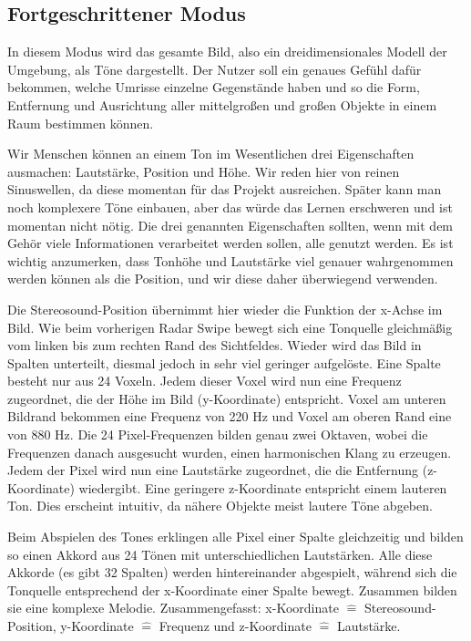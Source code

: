 \documentclass[a4paper,12pt,ngerman]{scrartcl}
\begin{document}
\subsection{Fortgeschrittener Modus}

In diesem Modus wird das gesamte Bild, also ein dreidimensionales Modell der Umgebung, als Töne dargestellt. 
Der Nutzer soll ein genaues Gefühl dafür bekommen, welche Umrisse einzelne Gegenstände haben und so die Form, Entfernung und Ausrichtung aller mittelgroßen und großen Objekte in einem Raum bestimmen können. \par 
Wir Menschen können an einem Ton im Wesentlichen drei
Eigenschaften ausmachen: Lautstärke, Position und Höhe. Wir reden hier von reinen Sinuswellen, da diese momentan für 
das Projekt ausreichen. Später kann man noch komplexere Töne einbauen, aber das würde das Lernen erschweren
und ist momentan nicht nötig. Die drei genannten Eigenschaften sollten, wenn mit dem Gehör viele Informationen
verarbeitet werden sollen, alle genutzt werden. Es ist wichtig anzumerken, dass Tonhöhe und Lautstärke viel genauer
wahrgenommen werden können als die Position, und wir diese daher überwiegend verwenden. \par 
Die Stereosound-Position übernimmt hier wieder die Funktion der x-Achse im Bild. Wie beim vorherigen Radar Swipe bewegt
sich eine Tonquelle gleichmäßig vom linken bis zum rechten Rand des Sichtfeldes. Wieder wird das Bild in Spalten 
unterteilt, diesmal jedoch in sehr viel geringer aufgelöste. Eine Spalte besteht nur aus 24 Voxeln.
Jedem dieser Voxel wird nun eine Frequenz zugeordnet, die der Höhe im Bild (y-Koordinate) entspricht.
Voxel am unteren Bildrand bekommen eine Frequenz von 220 Hz und Voxel am oberen Rand eine von 880 Hz. Die 24 
Pixel-Frequenzen bilden genau zwei Oktaven, wobei die Frequenzen danach ausgesucht wurden, einen harmonischen Klang zu erzeugen.
Jedem der Pixel wird nun eine Lautstärke zugeordnet, die die Entfernung (z-Koordinate) wiedergibt. Eine geringere
z-Koordinate entspricht einem lauteren Ton. Dies erscheint intuitiv, da nähere Objekte meist lautere Töne abgeben.\par 
Beim Abspielen des Tones erklingen alle Pixel einer Spalte gleichzeitig und bilden so einen Akkord aus 24 Tönen 
mit unterschiedlichen Lautstärken. Alle diese Akkorde (es gibt 32 Spalten) werden hintereinander abgespielt, während
sich die Tonquelle entsprechend der x-Koordinate einer Spalte bewegt. Zusammen bilden sie eine komplexe Melodie.
Zusammengefasst: x-Koordinate $\hat{=}$ Stereosound-Position, y-Koordinate $\hat{=}$ Frequenz und z-Koordinate $\hat{=}$ Lautstärke.
\end{document}
